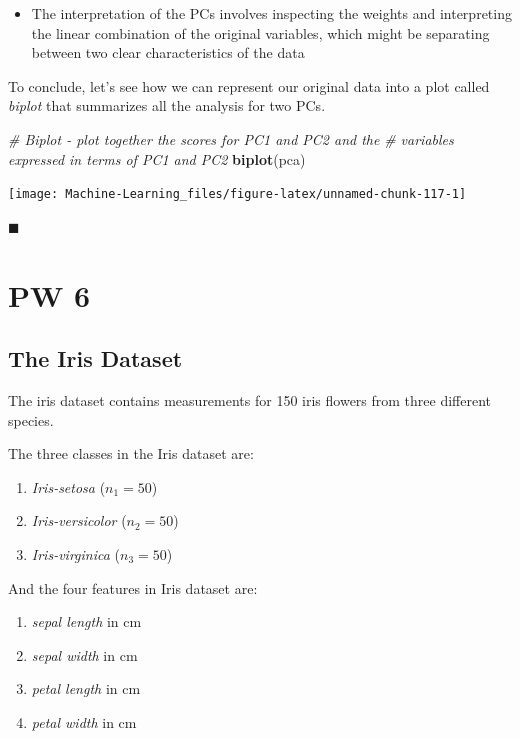 \documentclass[]{book}
\newenvironment{Shaded}{\begin{snugshade}}{\end{snugshade}}
\newcommand{\KeywordTok}[1]{\textcolor[rgb]{0.13,0.29,0.53}{\textbf{#1}}}
\newcommand{\CommentTok}[1]{\textcolor[rgb]{0.56,0.35,0.01}{\textit{#1}}}
\newcommand{\NormalTok}[1]{#1}
\providecommand{\tightlist}{%
  \setlength{\itemsep}{0pt}\setlength{\parskip}{0pt}}
\newenvironment{rmdblock}[1]
  {\begin{shaded*}
  \begin{itemize}
  \renewcommand{\labelitemi}{
    \raisebox{-.7\height}[0pt][0pt]{
      {\setkeys{Gin}{width=2em,keepaspectratio}\texttt{[image: img/icons/\#1]}}
    }
  }
  \item
  }
  {
  \end{itemize}
  \end{shaded*}
  }
\newenvironment{rmdtip}
  {\begin{rmdblock}{tip}}
  {\end{rmdblock}}
\begin{document}
\begin{rmdtip}
The interpretation of the PCs involves inspecting the weights and
interpreting the linear combination of the original variables, which
might be separating between two clear characteristics of the data
\end{rmdtip}

To conclude, let's see how we can represent our original data into a
plot called \emph{biplot} that summarizes all the analysis for two PCs.

\begin{Shaded}
\begin{Highlighting}[]
\CommentTok{# Biplot - plot together the scores for PC1 and PC2 and the}
\CommentTok{# variables expressed in terms of PC1 and PC2}
\KeywordTok{biplot}\NormalTok{(pca)}
\end{Highlighting}
\end{Shaded}

\begin{center}\texttt{[image: Machine-Learning\_files/figure-latex/unnamed-chunk-117-1]} \end{center}

◼

\chapter*{PW 6}\label{pw-6}

\section*{The Iris Dataset}\label{the-iris-dataset}

The iris dataset contains measurements for 150 iris flowers from three
different species.

The three classes in the Iris dataset are:

\begin{enumerate}
\def\labelenumi{\arabic{enumi}.}
\tightlist
\item
  \emph{Iris-setosa} (\(n_1=50\))
\item
  \emph{Iris-versicolor} (\(n_2=50\))
\item
  \emph{Iris-virginica} (\(n_3=50\))
\end{enumerate}

And the four features in Iris dataset are:

\begin{enumerate}
\def\labelenumi{\arabic{enumi}.}
\tightlist
\item
  \emph{sepal length} in cm
\item
  \emph{sepal width} in cm
\item
  \emph{petal length} in cm
\item
  \emph{petal width} in cm
\end{enumerate}
\end{document}
